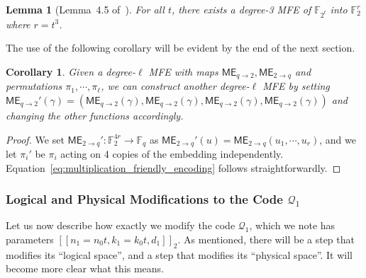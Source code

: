 \documentclass[11pt]{article}
\newtheorem{lemma}[theorem]{Lemma}
\newtheorem{corollary}[theorem]{Corollary}
\theoremstyle{definition}
\newcommand{\qcode}{\mathcal{Q}}
\newcommand{\FF}{\mathbb{F}}
\newcommand{\ME}{\mathsf{ME}_{q\rightarrow 2}}
\newcommand{\MEinv}{\mathsf{ME}_{2 \rightarrow q}}
\begin{document}
\begin{lemma}[Lemma~4.5 of~\cite{nguyen2024goodbinaryquantumcodes}]\label{lem:3MFE}
    For all $t$, there exists a degree-3 MFE of $\FF_{2^t}$ into $\FF_2^{r}$ where $r = t^3$.
\end{lemma}
The use of the following corollary will be evident by the end of the next section.
\begin{corollary}\label{cor:duplicated_MFE}
    Given a degree-$\ell$ MFE with maps $\ME, \MEinv$ and permutations $\pi_1,\cdots, \pi_\ell$, we can construct another degree-$\ell$ MFE by setting $\ME'(\gamma) = (\ME(\gamma),\ME(\gamma),\ME(\gamma),\ME(\gamma))$ and changing the other functions accordingly.
\end{corollary}
\begin{proof}
    We set $\MEinv':\FF_2^{4r}\rightarrow \FF_q$ as $\MEinv'(u) = \MEinv(u_1,\cdots, u_r)$, and we let $\pi_i'$ be $\pi_i$ acting on 4 copies of the embedding independently. Equation~\eqref{eq:multiplication_friendly_encoding} follows straightforwardly.
\end{proof}




\subsubsection{Logical and Physical Modifications to the Code  \texorpdfstring{$\mathcal{Q}_1$}{}}
Let us now describe how exactly we modify the code $\qcode_1$, which we note has parameters $[[n_1 = n_0t, k_1 = k_0t, d_1]]_2$. As mentioned, there will be a step that modifies its ``logical space'', and a step that modifies its ``physical space''. It will become more clear what this means.
\end{document}
